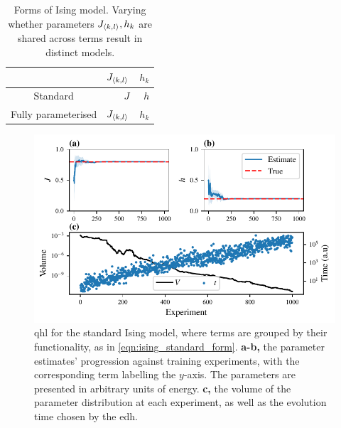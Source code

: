 \begin{table}[H]
    \begin{center}
        \begin{tabular}{crr}
             & $J_{{ \langle k, l \rangle }}$  & $h_{k}$ \\
            \hline
            Standard & $J$ & $h$ \\
            Fully parameterised & $J_{{ \langle k, l \rangle }}$ & $h_{k}$
        \end{tabular}
    \end{center}
    \caption[Forms of Ising model]{Forms of Ising model. Varying whether parameters $J_{{ \langle k, l \rangle }}, h_k$ are shared 
        across terms result in distinct models. 
    }
    \label{table:ising_models}
\end{table}

\par 

\begin{figure}[t]
    \begin{center}
        \includegraphics{theoretical_study/figures/standard_ising_qhl.pdf}
    \end{center}

    \caption[ for the standard Ising model]{
        \Acrlong{qhl} for the standard Ising model, where terms are grouped by their functionality, 
        as in \cref{eqn:ising_standard_form}. 
        \textbf{a-b,} the parameter estimates' progression against training \glspl{experiment}, 
            with the corresponding term labelling the $y$-axis. 
        The parameters are presented in arbitrary units of energy. 
        \textbf{c,} the \gls{volume} of the parameter distribution at each experiment, 
            as well as the evolution time chosen by the \gls{edh}. 
        \figtableref
    }
    \label{fig:ising_two_param_learning}
\end{figure}

